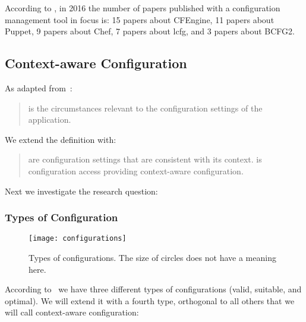 According to \citet{hintsch2016review}, in 2016 the number of papers published with a configuration management tool in focus is:
15 papers about CFEngine, 11 papers about Puppet, 9 papers about Chef, 7 papers about lcfg, and 3 papers about BCFG2.


\subsection{Context-aware Configuration}


As adapted from~\citet{chalmers2002contextual}:
\begin{quote}
 is the circumstances relevant to the configuration settings of the application.
\end{quote}

We extend the definition with:
\begin{quote}
 are configuration settings that are consistent with its context.
 is configuration access providing context-aware configuration.
\end{quote}

Next we investigate the research question:
\rqBackgroundViewpoints*

\subsubsection{Types of Configuration}

\begin{figure}[htp]
\centering
\texttt{[image: configurations]}
\caption[Types of configurations.]{Types of configurations.
The size of circles does not have a meaning here.}
\label{fig:configurations}
\end{figure}

According to~\citet{wielinga1997configuration} we have three different types of configurations (valid, suitable, and optimal).
We will extend it with a fourth type, orthogonal to all others that we will call context-aware configuration:

